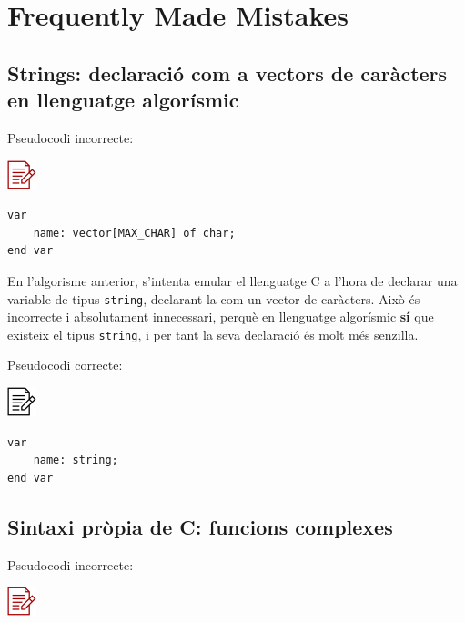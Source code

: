 \documentclass[
]{book}
\begin{document}
\hypertarget{frequently-made-mistakes-2}{%
\section{Frequently Made Mistakes}\label{frequently-made-mistakes-2}}

\hypertarget{strings-declaraciuxf3-com-a-vectors-de-caruxe0cters-en-llenguatge-algoruxedsmic}{%
\subsection{Strings: declaració com a vectors de caràcters en llenguatge algorísmic}\label{strings-declaraciuxf3-com-a-vectors-de-caruxe0cters-en-llenguatge-algoruxedsmic}}

Pseudocodi incorrecte:

\includegraphics{./img/alg_err.png}

\begin{verbatim}
var
    name: vector[MAX_CHAR] of char;
end var
\end{verbatim}

En l'algorisme anterior, s'intenta emular el llenguatge C a l'hora de declarar una variable de tipus \texttt{string}, declarant-la com un vector de caràcters. Això és incorrecte i absolutament innecessari, perquè en llenguatge algorísmic \textbf{sí} que existeix el tipus \texttt{string}, i per tant la seva declaració és molt més senzilla.

Pseudocodi correcte:

\includegraphics{./img/alg.png}

\begin{verbatim}
var
    name: string;
end var
\end{verbatim}

\hypertarget{sintaxi-pruxf2pia-de-c-funcions-complexes}{%
\subsection{Sintaxi pròpia de C: funcions complexes}\label{sintaxi-pruxf2pia-de-c-funcions-complexes}}

Pseudocodi incorrecte:

\includegraphics{./img/alg_err.png}
\end{document}
